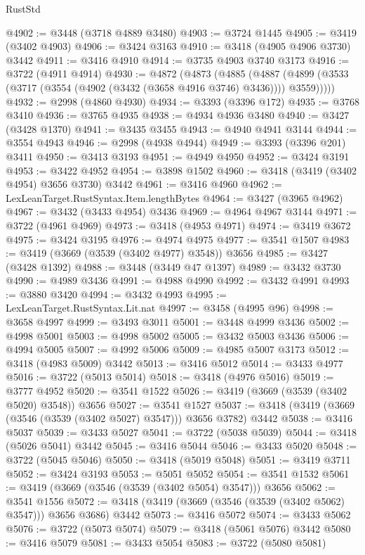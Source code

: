 \begin{lexlean}{RustStd}
\begin{coremodule}
@4902 := @3448 (@3718 @4889 @3480)
@4903 := @3724 @1445
@4905 := @3419 (@3402 @4903)
@4906 := @3424 @3163
@4910 := @3418 (@4905 @4906 @3730) @3442
@4911 := @3416 @4910
@4914 := @3735 @4903 @3740 @3173
@4916 := @3722 (@4911 @4914)
@4930 := @4872
    (@4873
      (@4885
        (@4887 (@4899 (@3533 (@3717 (@3554 (@4902 (@3432 (@3658 @4916 @3746) @3436)))) @3559)))))
@4932 := @2998 (@4860 @4930)
@4934 := @3393 (@3396 @172)
@4935 := @3768 @3410
@4936 := @3765 @4935
@4938 := @4934 @4936 @3480
@4940 := @3427 (@3428 @1370)
@4941 := @3435 @3455
@4943 := @4940 @4941 @3144
@4944 := @3554 @4943
@4946 := @2998 (@4938 @4944)
@4949 := @3393 (@3396 @201) @3411
@4950 := @3413 @3193
@4951 := @4949 @4950
@4952 := @3424 @3191
@4953 := @3422 @4952
@4954 := @3898 @1502
@4960 := @3418 (@3419 (@3402 @4954) @3656 @3730) @3442
@4961 := @3416 @4960
@4962 := LexLeanTarget.RustSyntax.Item.lengthBytes
@4964 := @3427 (@3965 @4962)
@4967 := @3432 (@3433 @4954) @3436
@4969 := @4964 @4967 @3144
@4971 := @3722 (@4961 @4969)
@4973 := @3418 (@4953 @4971)
@4974 := @3419 @3672
@4975 := @3424 @3195
@4976 := @4974 @4975
@4977 := @3541 @1507
@4983 := @3419 (@3669 (@3539 (@3402 @4977) @3548)) @3656
@4985 := @3427 (@3428 @1392)
@4988 := @3448 (@3449 @47 @1397)
@4989 := @3432 @3730
@4990 := @4989 @3436
@4991 := @4988 @4990
@4992 := @3432 @4991
@4993 := @3880 @3420
@4994 := @3432 @4993
@4995 := LexLeanTarget.RustSyntax.Lit.nat
@4997 := @3458 (@4995 @96)
@4998 := @3658 @4997
@4999 := @3493 @3011
@5001 := @3448 @4999 @3436
@5002 := @4998 @5001
@5003 := @4998 @5002
@5005 := @3432 @5003 @3436
@5006 := @4994 @5005
@5007 := @4992 @5006
@5009 := @4985 @5007 @3173
@5012 := @3418 (@4983 @5009) @3442
@5013 := @3416 @5012
@5014 := @3433 @4977
@5016 := @3722 (@5013 @5014)
@5018 := @3418 (@4976 @5016)
@5019 := @3777 @4952
@5020 := @3541 @1522
@5026 := @3419 (@3669 (@3539 (@3402 @5020) @3548)) @3656
@5027 := @3541 @1527
@5037 := @3418 (@3419 (@3669 (@3546 (@3539 (@3402 @5027) @3547))) @3656 @3782) @3442
@5038 := @3416 @5037
@5039 := @3433 @5027
@5041 := @3722 (@5038 @5039)
@5044 := @3418 (@5026 @5041) @3442
@5045 := @3416 @5044
@5046 := @3433 @5020
@5048 := @3722 (@5045 @5046)
@5050 := @3418 (@5019 @5048)
@5051 := @3419 @3711
@5052 := @3424 @3193
@5053 := @5051 @5052
@5054 := @3541 @1532
@5061 := @3419 (@3669 (@3546 (@3539 (@3402 @5054) @3547))) @3656
@5062 := @3541 @1556
@5072 := @3418 (@3419 (@3669 (@3546 (@3539 (@3402 @5062) @3547))) @3656 @3686) @3442
@5073 := @3416 @5072
@5074 := @3433 @5062
@5076 := @3722 (@5073 @5074)
@5079 := @3418 (@5061 @5076) @3442
@5080 := @3416 @5079
@5081 := @3433 @5054
@5083 := @3722 (@5080 @5081)

\end{coremodule}
\end{lexlean}
